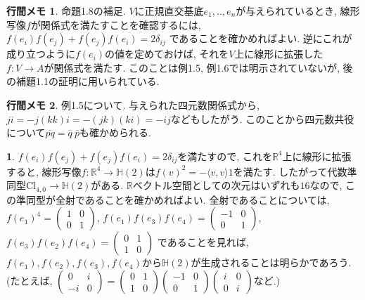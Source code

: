 \documentclass[dvipdfmx]{amsart}
\theoremstyle{definition}
\newtheorem{ans}{}
\numberwithin{ans}{section}
\newtheorem{mynote}{行間メモ}
\numberwithin{mynote}{section}
\newenvironment{note}
  {\begin{leftbar}\begin{mynote}}
  {\end{mynote}\end{leftbar}}
\begin{document}
\begin{note}
  命題1.8の補足. $V$に正規直交基底$e_1,..,e_n$が与えられているとき,
  線形写像$f$が関係式を満たすことを確認するには,
  $f(e_i)f(e_j) + f(e_j)f(e_i) = 2\delta_{ij}$
  であることを確かめればよい.
  逆にこれが成り立つように$f(e_i)$の値を定めておけば, それを$V$上に線形に拡張した
  $f: V \rightarrow A$が関係式を満たす.
  このことは例1.5, 例1.6では明示されていないが, 後の補題1.1の証明に用いられている.
\end{note}

\begin{note}
  例1.5について. 与えられた四元数関係式から, $ji = -j(kk)i = -(jk)(ki) = -ij$などもしたがう.
  このことから四元数共役について$\overline{pq} = \overline{q}\ \overline{p}$も確かめられる.
\end{note}

\begin{ans}
  $f(e_i)f(e_j) + f(e_j)f(e_i) = 2\delta_{ij}$を満たすので,
  これを$\mathbb{R}^4$上に線形に拡張すると,
  線形写像$f: \mathbb{R}^4 \rightarrow \mathbb{H}(2)$は$f(v)^2 = -\langle v, v \rangle 1$を満たす.
  したがって代数準同型$\mathrm{Cl}_{4, 0} \rightarrow \mathbb{H}(2)$がある.
  $\mathbb{R}$ベクトル空間としての次元はいずれも$16$なので, この準同型が全射であることを確かめればよい.
  全射であることについては,
  $f(e_1)^4 = \begin{pmatrix}
    1 & 0 \\
    0 & 1
  \end{pmatrix}$,
  $f(e_1)f(e_3)f(e_4) = \begin{pmatrix}
    -1 & 0 \\
    0 & 1
  \end{pmatrix}$,
  $f(e_3)f(e_2)f(e_4) = \begin{pmatrix}
    0 & 1 \\
    1 & 0
  \end{pmatrix}$
  であることを見れば, $f(e_1), f(e_2), f(e_3), f(e_4)$から$\mathbb{H}(2)$が生成されることは明らかであろう.
  (たとえば, $\begin{pmatrix}
    0 & i \\
    -i & 0
  \end{pmatrix} = \begin{pmatrix}
    0 & 1 \\
    1 & 0
  \end{pmatrix}\begin{pmatrix}
    -1 & 0 \\
    0 & 1
  \end{pmatrix}\begin{pmatrix}
    i & 0 \\
    0 & i
  \end{pmatrix}$など.)
\end{ans}
\end{document}
